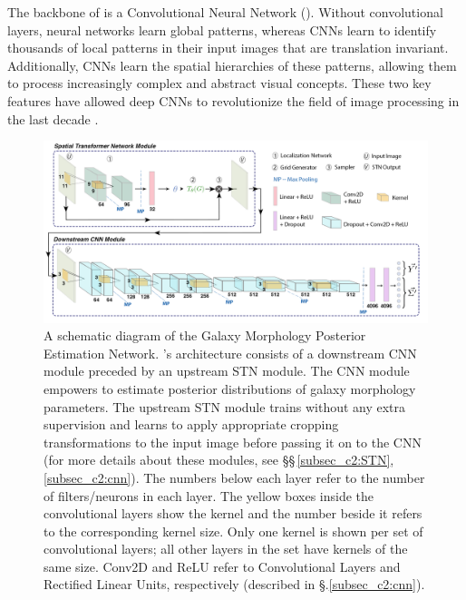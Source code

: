 
The %
backbone of \gampen{} is a Convolutional Neural Network (\citealp{fukushima_80, lecun_98}). %
Without convolutional layers, neural networks learn global patterns, whereas CNNs learn to identify thousands of local patterns in their input images that are translation invariant.
Additionally, CNNs learn the spatial hierarchies of these patterns, allowing them to process increasingly complex and abstract visual concepts. These two key features have allowed deep CNNs to revolutionize the field of image processing in the last decade \citep{lecun_15, dl_overview}. 

\begin{figure}[htb]
    \centering
    \includegraphics[width
    =\textwidth]{gampen_schematic.png}
    \caption{A schematic diagram of the Galaxy Morphology Posterior Estimation Network. \gampen's architecture consists of a downstream CNN module preceded by an upstream STN module. The CNN module empowers \gampen{} to estimate posterior distributions of galaxy morphology parameters. The upstream STN module trains without any extra supervision and learns to apply appropriate cropping transformations to the input image before passing it on to the CNN (for more details about these modules, see \S\S\,\ref{subsec_c2:STN}, \ref{subsec_c2:cnn}).
    The numbers below each layer refer to the number of filters/neurons in each layer. The yellow boxes inside the convolutional layers show the kernel and the number beside it refers to the corresponding kernel size. Only one kernel is shown per set of convolutional layers; all other layers in the set have kernels of the same size. Conv2D and ReLU refer to Convolutional Layers and Rectified Linear Units, respectively (described in \S.\ref{subsec_c2:cnn}).}
    \label{fig_c2:gampen_schematic}
\end{figure}


